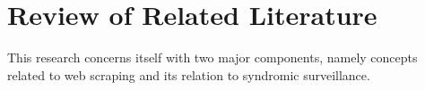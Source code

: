 \chapter{Review of Related Literature}


This research concerns itself with two major components, namely concepts related to web scraping and its relation to syndromic surveillance. 




















